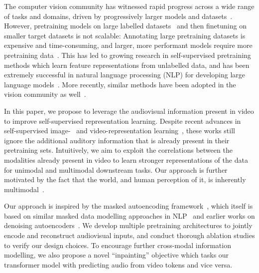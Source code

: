 \documentclass[10pt,twocolumn,letterpaper]{article}
\begin{document}
 
The computer vision community has witnessed rapid progress across a wide range of tasks and domains, driven by progressively larger models and datasets~\cite{dosovitskiy_iclr_2021,radford2021learning,bommasani2021opportunities,yuan2021florence,singh2022flava}.
However, pretraining models on large labelled datasets~\cite{deng_cvpr_2009,sun_iccv_2017,mahajan_eccv_2018} and then finetuning on smaller target datasets is not scalable: Annotating large pretraining datasets is expensive and time-consuming, and larger, more performant models require more pretraining data~\cite{dosovitskiy_iclr_2021}.
This has led to growing research in self-supervised pretraining methods which learn feature representations from unlabelled data, and has been extremely successful in natural language processing (NLP) for developing large language models~\cite{brown2020language, devlin_naacl_2019, smith2022using}.
More recently, similar methods have been adopted in the vision community as well~\cite{bao2021beit,he2022masked,wei2022masked}.



In this paper, we propose to leverage the audiovisual information present in video to improve self-supervised representation learning. Despite recent advances in self-supervised image-~\cite{he2022masked, bao2021beit} and video-representation learning~\cite{feichtenhofer2022masked,wei2022masked,tong2022videomae}, these works still ignore the additional auditory information that is already present in their pretraining sets. Intuitively, we aim to exploit the correlations between the modalities already present in video to learn stronger representations of the data for unimodal and multimodal downstream tasks.
Our approach is further motivated by the fact that the world, and human perception of it, is inherently multimodal~\cite{smith2005development, shams2010crossmodal}.


Our approach is inspired by the masked autoencoding framework~\cite{he2022masked, bao2021beit}, which itself is based on similar masked data modelling approaches in NLP~\cite{devlin_naacl_2019} and earlier works on denoising autoencoders~\cite{vincent2008extracting,pathak2016context}.
We develop multiple pretraining architectures to jointly encode and reconstruct audiovisual inputs, and conduct thorough ablation studies to verify our design choices.
To encourage further cross-modal information modelling, we also propose a novel ``inpainting'' objective which tasks our transformer model with predicting audio from video tokens and vice versa.
\end{document}
